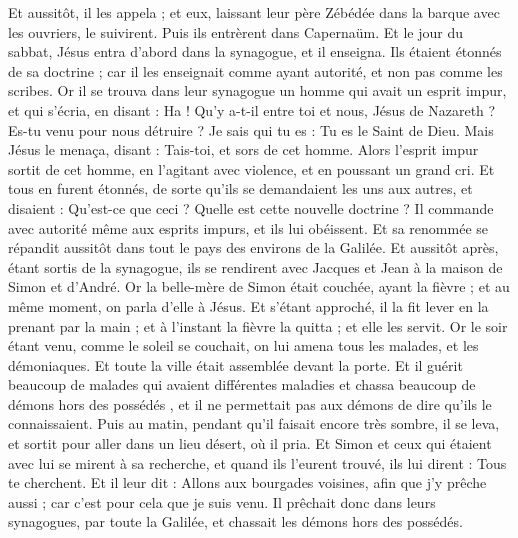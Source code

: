 \begin{multicols}{2}
Et aussitôt, il les appela ; et eux, laissant leur père Zébédée dans la barque avec les ouvriers, le suivirent.
Puis ils entrèrent dans Capernaüm. Et le jour du sabbat, Jésus entra d’abord dans la synagogue, et il enseigna.
Ils étaient étonnés de sa doctrine ; car il les enseignait comme ayant autorité, et non pas comme les scribes.
Or il se trouva dans leur synagogue un homme qui avait un esprit impur, et qui s'écria,
en disant : Ha ! Qu’y a-t-il entre toi et nous, Jésus de Nazareth ? Es-tu venu pour nous détruire ? Je sais qui tu es : Tu es le Saint de Dieu.
Mais Jésus le menaça, disant : Tais-toi, et sors de cet homme.
Alors l'esprit impur sortit de cet homme, en l’agitant avec violence, et en poussant un grand cri.
Et tous en furent étonnés, de sorte qu'ils se demandaient les uns aux autres, et disaient : Qu'est-ce que ceci ? Quelle est cette nouvelle doctrine ? Il commande avec autorité même aux esprits impurs, et ils lui obéissent.
Et sa renommée se répandit aussitôt dans tout le pays des environs de la Galilée.
Et aussitôt après, étant sortis de la synagogue, ils se rendirent avec Jacques et Jean à la maison de Simon et d'André.
Or la belle-mère de Simon était couchée, ayant la fièvre ; et au même moment, on parla d’elle à Jésus.
Et s’étant approché, il la fit lever en la prenant par la main ; et à l'instant la fièvre la quitta ; et elle les servit.
Or le soir étant venu, comme le soleil se couchait, on lui amena tous les malades, et les démoniaques.
Et toute la ville était assemblée devant la porte.
Et il guérit beaucoup de malades qui avaient différentes maladies et chassa beaucoup de démons hors des possédés , et il ne permettait pas aux  démons de dire qu'ils le connaissaient.
Puis au matin, pendant qu’il faisait encore très sombre, il se leva, et sortit pour aller dans un lieu désert, où il pria.
Et Simon et ceux qui étaient avec lui se mirent à sa recherche,
et quand ils l’eurent trouvé, ils lui dirent : Tous te cherchent.
Et il leur dit : Allons aux bourgades voisines, afin que j'y prêche aussi ; car c’est pour cela que je suis venu.
Il prêchait donc dans leurs synagogues, par toute la Galilée, et chassait les démons hors des possédés.

\end{multicols}
